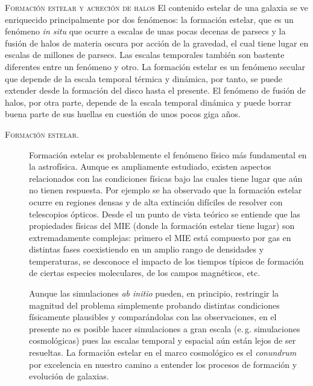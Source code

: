 \documentclass[xcolor=dvipsnames,4pt,hyperref={colorlinks,citecolor=black,linkcolor=black,urlcolor=black}]{beamer}
\begin{document}
\begin{frame}[allowframebreaks]{\textsc{Formación estelar y acreción de halos}}
%
El contenido estelar de una galaxia se ve enriquecido principalmente por dos fenómenos: la formación
estelar, que es un fenómeno \emph{in situ} que ocurre a escalas de unas pocas decenas de parsecs
y la fusión de halos de materia oscura por acción de la gravedad, el cual tiene lugar en escalas de
millones de parsecs.
Las escalas temporales también son bastente diferentes entre un fenómeno y otro. La formación
estelar es un fenómeno secular que depende de la escala temporal térmica y dinámica, por tanto, se
puede extender desde la formación del disco hasta el presente. El fenómeno de fusión de halos, por
otra parte, depende de la escala temporal dinámica y puede borrar buena parte de sus huellas en
cuestión de unos pocos giga años.

\begin{description}
%
\item[\textsc{Formación estelar.}] Formación estelar es probablemente el fenómeno físico más
fundamental en la astrofísica. Aunque es ampliamente estudiado, existen aspectos relacionados con
las condiciones físicas bajo las cuales tiene lugar que aún no tienen respuesta. Por ejemplo se ha
observado que la formación estelar ocurre en regiones densas y de alta extinción difíciles de
resolver con telescopios ópticos. Desde el un punto de vista teórico se entiende que las propiedades
físicas del MIE (donde la formación estelar tiene lugar) son extremadamente complejas: primero el
MIE está compuesto por gas en distintas fases coexistiendo en un amplio rango de densidades y
temperaturas, se desconoce el impacto de los tiempos típicos de formación de ciertas especies
moleculares, de los campos magnéticos, etc.

Aunque las simulaciones \emph{ab initio} pueden, en principio, restringir la magnitud del problema
simplemente probando distintas condiciones físicamente plausibles y comparándolas con las
observaciones, en el presente no es posible hacer simulaciones a gran escala (e.\,g. simulaciones
cosmológicas) pues las escalas temporal y espacial aún están lejos de ser resueltas. La formación
estelar en el marco cosmológico es el \emph{conundrum} por excelencia en nuestro camino a entender
los procesos de formación y evolución de galaxias.


\end{description}
\end{frame}
\end{document}
